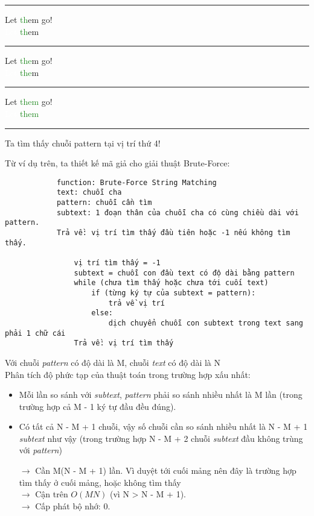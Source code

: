 \documentclass[a4paper,11pt]{article}
\begin{document}
\begin{enumerate}
			\vspace*{2mm}
			\hrule
			Let \textcolor{ForestGreen}{th}em go!\\
			\textcolor{white}{Let }\textcolor{ForestGreen}{th}em
			
			\vspace*{2mm}
			\hrule
			Let \textcolor{ForestGreen}{the}m go!\\
			\textcolor{white}{Let }\textcolor{ForestGreen}{the}m
						
			\vspace*{2mm}
			\hrule
			Let \textcolor{ForestGreen}{them} go!\\
			\textcolor{white}{Let }\textcolor{ForestGreen}{them}
			\vspace*{2mm}
			\hrule

			Ta tìm thấy chuỗi pattern tại vị trí thứ 4!
			
			Từ ví dụ trên, ta thiết kế mã giả cho giải thuật Brute-Force:

			\begin{lstlisting}
			function: Brute-Force String Matching
			text: chuỗi cha 
			pattern: chuỗi cần tìm 
			subtext: 1 đoạn thân của chuỗi cha có cùng chiều dài với pattern.
			Trả về: vị trí tìm thấy đầu tiên hoặc -1 nếu không tìm thấy.
			
				vị trí tìm thấy = -1
				subtext = chuỗi con đầu text có độ dài bằng pattern
				while (chưa tìm thấy hoặc chưa tới cuối text)
					if (từng ký tự của subtext = pattern):
						trả về vị trí
					else:
						dịch chuyển chuỗi con subtext trong text sang phải 1 chữ cái
				Trả về: vị trí tìm thấy
					\end{lstlisting}
			
			Với chuỗi \textit{pattern} có độ dài là M, chuỗi \textit{text} có độ dài là N \\
			Phân tích độ phức tạp của thuật toán trong trường hợp xấu nhất:
			\begin{itemize}
				\item Mỗi lần so sánh với \textit{subtext}, \textit{pattern} phải so sánh nhiều nhất là M lần (trong trường hợp cả M - 1 ký tự đầu đều đúng).
				\item Có tất cả N - M + 1 chuỗi, vậy số chuỗi cần so sánh nhiều nhất là N - M + 1 \textit{subtext} như vậy (trong trường hợp N - M + 2 chuỗi \textit{subtext} đầu không trùng với \textit{pattern})
				
				$\to$ Cần M(N - M + 1) lần. Vì duyệt tới cuối mảng nên đây là trường hợp tìm thấy ở cuối mảng, hoặc không tìm thấy\\
				$\to$ Cận trên $O(MN)$ (vì N > N - M + 1). \\
				$\to$ Cấp phát bộ nhớ: 0.
			\end{itemize}


\end{enumerate}
\end{document}
